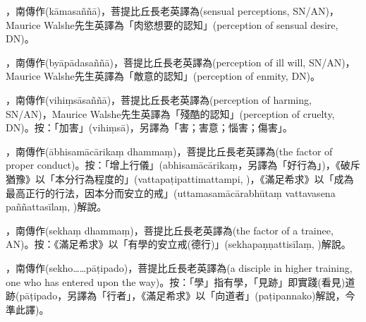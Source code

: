 \startitemgroup[noteitems]
\item{}，南傳作(kāmasaññā)，菩提比丘長老英譯為(sensual perceptions, SN/AN)，Maurice Walshe先生英譯為「肉慾想要的認知」(perception of sensual desire, DN)。
\item{}，南傳作(byāpādasaññā)，菩提比丘長老英譯為(perception of ill will, SN/AN)，Maurice Walshe先生英譯為「敵意的認知」(perception of enmity, DN)。
\item{}，南傳作(vihiṃsāsaññā)，菩提比丘長老英譯為(perception of harming, SN/AN)，Maurice Walshe先生英譯為「殘酷的認知」(perception of cruelty, DN)。按：「加害」(vihiṃsā)，另譯為「害；害意；惱害；傷害」。
\stopitemgroup

\startitemgroup[noteitems]
\item{}，南傳作(ābhisamācārikaṃ dhammaṃ)，菩提比丘長老英譯為(the factor of proper conduct)。按：「增上行儀」(abhisamācārikaṃ，另譯為「好行為」)，《破斥猶豫》以「本分行為程度的」(vattapaṭipattimattampi, )，《滿足希求》以「成為最高正行的行法，因本分而安立的戒」(uttamasamācārabhūtaṃ vattavasena paññattasīlaṃ, )解說。
\stopitemgroup

\startitemgroup[noteitems]
\item{}，南傳作(sekhaṃ dhammaṃ)，菩提比丘長老英譯為(the factor of a trainee, AN)。按：《滿足希求》以「有學的安立戒(德行)」(sekhapaṇṇattisīlaṃ, )解說。
\item{}，南傳作(sekho……pāṭipado)，菩提比丘長老英譯為(a disciple in higher training, one who has entered upon the way)。按：「學」指有學，「見跡」即實踐(看見)道跡(pāṭipado，另譯為「行者」，《滿足希求》以「向道者」(paṭipannako)解說，今準此譯)。
\stopitemgroup

